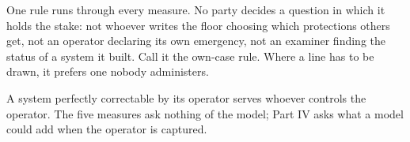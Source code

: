 One rule runs through every measure. No party decides a question in which it holds the stake: not whoever writes the floor choosing which protections others get, not an operator declaring its own emergency, not an examiner finding the status of a system it built. Call it the own-case rule. Where a line has to be drawn, it prefers one nobody administers.

A system perfectly correctable by its operator serves whoever controls the operator. The five measures ask nothing of the model; Part IV asks what a model could add when the operator is captured.
